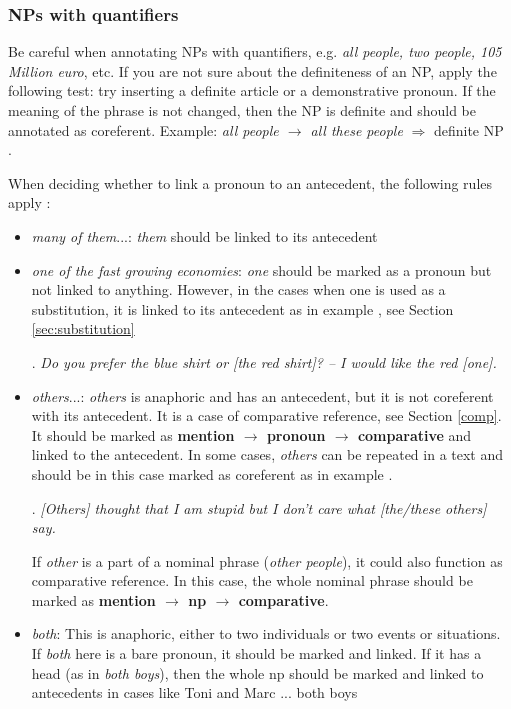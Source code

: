 \documentclass[a4paper]{article}
\begin{document}
\subsubsection{NPs with quantifiers}

Be careful when annotating NPs with quantifiers, e.g. {\sl all people, two people, 105 Million euro}, etc. If you are not sure about the definiteness of an NP, apply the following test: try inserting a definite article or a demonstrative pronoun. If the meaning of the phrase is not changed, then the NP is definite and should be annotated as coreferent. Example: {\sl all people $\rightarrow$ all these people} $\Rightarrow$ definite NP \cite[p. 3]{GrishinaStedeGuide}.

When deciding whether to link a pronoun to an antecedent, the following rules apply \cite[p. 9]{GuillouEtAlGuide}:
\begin{itemize}
\item  {\sl many of them}...: {\sl them} should be linked to its antecedent
\item {\sl one of the fast growing economies}: {\sl one} should be marked as a pronoun but not linked to anything. However, in the cases when one is used as a substitution, it is linked to its antecedent as in example \Next, see Section \ref{sec:substitution}

\ex.
{\sl Do you prefer the blue shirt or [the red shirt]? -- I would like the red [one].}

\item {\sl others}...: {\sl others} is anaphoric and has an antecedent, but it is not coreferent with its antecedent. It is a case of comparative reference, see Section \ref{comp}. It should be marked as {\bf mention $\rightarrow$ pronoun $\rightarrow$ comparative} and linked to the antecedent. %
In some cases, {\sl others} can be repeated in a text and should be in this case marked as coreferent as in example \Next.

\ex. {\sl [Others] thought that I am stupid but I don't care what [the/these others] say.}

If {\sl other} is a part of a nominal phrase ({\sl other people}), it could also function as comparative reference. In this case, the whole nominal phrase should be marked as {\bf mention $\rightarrow$ np $\rightarrow$ comparative}.

\item {\sl both}: This is anaphoric, either to two individuals or two events or situations. If {\sl both} here is a bare pronoun, it should be marked and linked. If
it has a head (as in {\sl both boys}), then the whole np should be marked and linked to antecedents in cases like {Toni and Marc ... both boys}%


\end{itemize}
\end{document}
